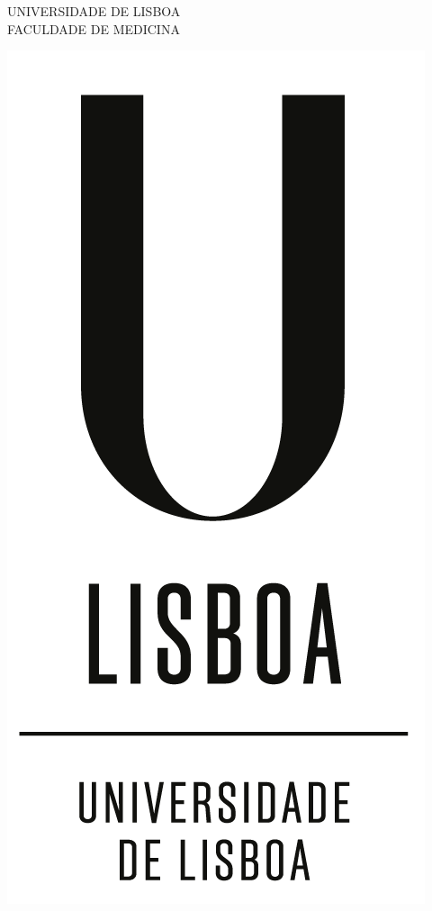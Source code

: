 \begin{titlepage}
    \begin{center}
        UNIVERSIDADE DE LISBOA\\
        FACULDADE DE MEDICINA
        
        \vspace{1cm}
        
        {\includegraphics{figures/cover/UL-VerticalPositivo.png}}
        

\end{center}
\end{titlepage}
